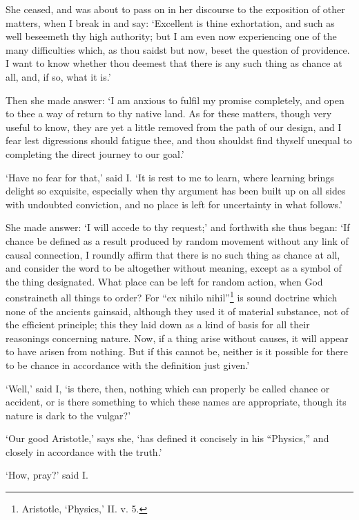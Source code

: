 \documentclass[11pt]{book}
\begin{document}
She ceased, and was about to pass on in her discourse to the exposition
of other matters, when I break in and say: `Excellent is thine
exhortation, and such as well beseemeth thy high authority; but I am
even now experiencing one of the many difficulties which, as thou saidst
but now, beset the question of providence. I want to know whether thou
deemest that there is any such thing as chance at all, and, if so, what
it is.'

Then she made answer: `I am anxious to fulfil my promise completely, and
open to thee a way of return to thy native land. As for these matters,
though very useful to know, they are yet a little removed from the path
of our design, and I fear lest digressions should fatigue thee, and thou
shouldst find thyself unequal to completing the direct journey to our
goal.'

`Have no fear for that,' said I. `It is rest to me to learn, where
learning brings delight so exquisite, especially when thy argument has
been built up on all sides with undoubted conviction, and no place is
left for uncertainty in what follows.'

She made answer: `I will accede to thy request;' and forthwith she thus
began: `If chance be defined as a result produced by random movement
without any link of causal connection, I roundly affirm that there is no
such thing as chance at all, and consider the word to be altogether
without meaning, except as a symbol of the thing designated. What place
can be left for random action, when God constraineth all things to
order? For ``ex nihilo nihil''\footnote{Aristotle, `Physics,’ II. v. 5.} is sound doctrine which none of the
ancients gainsaid, although they used it of material substance, not of
the efficient principle; this they laid down as a kind of basis for all
their reasonings concerning nature. Now, if a thing arise without
causes, it will appear to have arisen from nothing. But if this cannot
be, neither is it possible for there to be chance in accordance with the
definition just given.'

`Well,' said I, `is there, then, nothing which can properly be called
chance or accident, or is there something to which these names are
appropriate, though its nature is dark to the vulgar?'

`Our good Aristotle,' says she, `has defined it concisely in his
``Physics,'' and closely in accordance with the truth.'

`How, pray?' said I.
\end{document}
